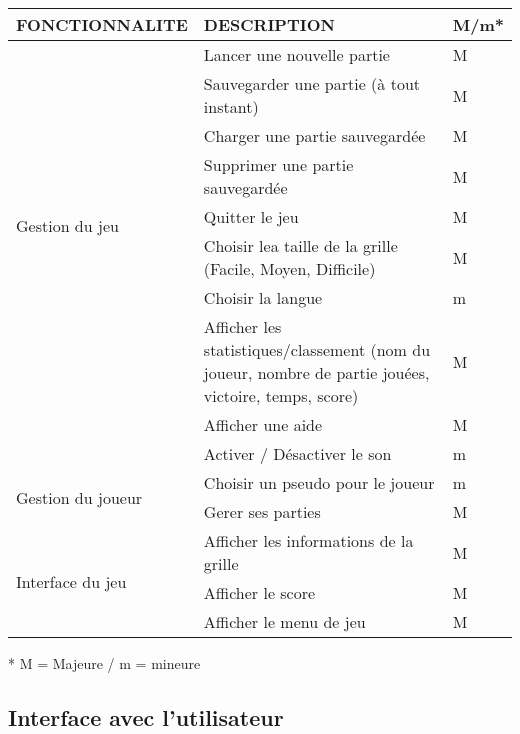 \documentclass[11pt]{article}
\begin{document}
\small
\begin{tabular}{|p{4cm}|p{10cm}|p{1cm}|}
  \hline
  \textbf{FONCTIONNALITE} & \textbf{DESCRIPTION} & \textbf{M/m*}\\
  \hline
     \multirow{8}{*}{Gestion du jeu}
        & Lancer une nouvelle partie                                  & M \\  \cline{2-3}
        & Sauvegarder une partie (à tout instant)                     & M \\  \cline{2-3}
        & Charger une partie sauvegardée                              & M \\  \cline{2-3}
        & Supprimer une partie sauvegardée                            & M \\  \cline{2-3}
        & Quitter le jeu                                              & M \\  \cline{2-3}
        & Choisir lea taille de la grille (Facile, Moyen, Difficile)  & M \\  \cline{2-3}
        & Choisir la langue                                           & m \\  \cline{2-3}
        & Afficher les statistiques/classement (nom du joueur, nombre de partie jouées, victoire, temps, score) & M \\  \cline{2-3}
        & Afficher une aide                                           & M \\  \cline{2-3}
        & Activer / Désactiver le son                                 & m \\
  \hline
     \multirow{2}{*}{Gestion du joueur}
        & Choisir un pseudo pour le joueur                                            & m \\  \cline{2-3}           & Gerer ses parties 														  & M \\  \cline{2-3}
  \hline
     \multirow{3}{*}{Interface du jeu}
        & Afficher les informations de la grille                                                 & M \\  \cline{2-3}
        & Afficher le score                                                       & M \\  \cline{2-3}
        & Afficher le menu de jeu                                                     & M \\
  \hline
\end{tabular}
\normalsize

* M = Majeure / m = mineure



\subsection{Interface avec l'utilisateur}
\end{document}

